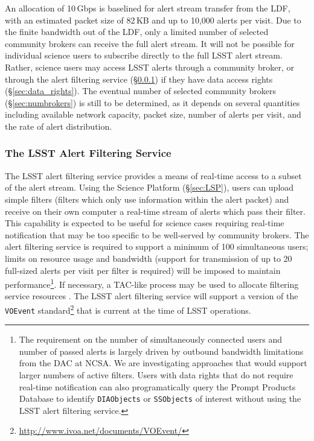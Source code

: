 An allocation of 10\,Gbps is baselined for alert stream transfer from the LDF, with an estimated packet size of 82\,KB and up to 10,000 alerts per visit.
Due to the finite bandwidth out of the LDF, only a limited number of selected community brokers can receive the full alert stream.
It will not be possible for individual science users to subscribe directly to the full LSST alert stream.
Rather, science users may access LSST alerts through a community broker, or through the alert filtering service (\S \ref{sec:filtering_service}) if they have data access rights (\S \ref{sec:data_rights}).
The eventual number of selected community brokers (\S \ref{sec:numbrokers}) is still to be determined, as it depends on several quantities including available network capacity, packet size, number of alerts per visit, and the rate of alert distribution.


\subsubsection{The LSST Alert Filtering Service}\label{sec:filtering_service}

The LSST alert filtering service provides a means of real-time access to a subset of the alert stream.
Using the Science Platform (\S \ref{sec:LSP}),
users can upload simple filters (filters which only use information within the alert packet) and receive on their own computer a real-time stream of alerts which pass their filter.
This capability is expected to be useful for science cases requiring real-time notification that may be too specific to be well-served by community brokers.
The alert filtering service is required to support a minimum of 100 simultaneous users; limits on resource usage and bandwidth (support for transmission of up to 20 full-sized alerts per visit per filter is required) will be imposed to maintain performance\footnote{
The requirement on the number of simultaneously connected users and number of passed alerts is largely driven by outbound bandwidth limitations from the DAC at NCSA.
We are investigating approaches that would support larger numbers of active filters.
Users with data rights that do not require real-time notification can also programatically query the Prompt Products Database to identify \texttt{DIAObjects} or \texttt{SSObjects} of interest without using the LSST alert filtering service.}.
If necessary, a TAC-like process may be used to allocate filtering service resources .
The LSST alert filtering service will support a version of the \texttt{VOEvent} standard\footnote{\url{http://www.ivoa.net/documents/VOEvent/}} that is current at the time of LSST operations.

